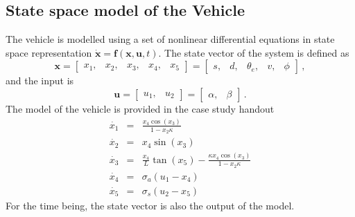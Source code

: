 \subsection*{State space model of the Vehicle}
The vehicle is modelled using a set of nonlinear differential equations in state space representation $\mathbf{\dot{x}} = \mathbf{f}(\mathbf{x}, \mathbf{u}, t)$.
The state vector of the system is defined as
\begin{equation}
	\mathbf{x} = \begin{bmatrix}
		x_1, &x_2, &x_3, &x_4, &x_5
	\end{bmatrix} = \begin{bmatrix}
		s, &d, &\theta_e, &v, &\phi
	\end{bmatrix}\, ,
\end{equation}
and the input is
\begin{equation}
	\mathbf{u} = \begin{bmatrix}
		u_1, &u_2	
	\end{bmatrix} = \begin{bmatrix}
		\alpha, &\beta
	\end{bmatrix}\, .
\end{equation}
The model of the vehicle is provided in the case study handout
\begin{eqnarray}
	\dot{x_1} &=& \frac{x_4 \cos(x_3)}{1 - x_2\kappa}\label{eq:ss1}\\
	\dot{x_2} &=& x_4 \sin(x_3)\label{eq:ss2}\\
	\dot{x_3} &=& \frac{x_4}{L}\tan(x_5) - \frac{\kappa x_4 \cos(x_3)}{1 - x_2 \kappa}\label{eq:ss3}\\
	\dot{x_4} &=& \sigma_a (u_1 - x_4)\label{eq:ss4}\\
	\dot{x_5} &=& \sigma_s (u_2 - x_5)\label{eq:ss5}
\end{eqnarray}
For the time being, the state vector is also the output of the model.
